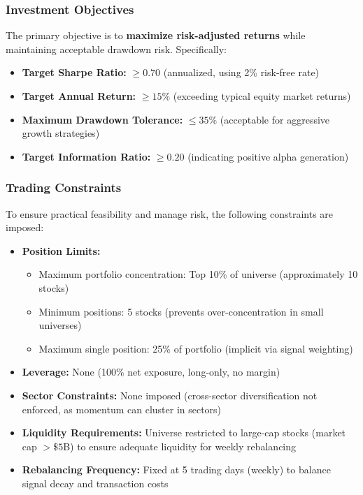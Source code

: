\documentclass[conference]{IEEEtran}
\begin{document}
\subsubsection{Investment Objectives}
The primary objective is to \textbf{maximize risk-adjusted returns} while maintaining acceptable drawdown risk. Specifically:
\begin{itemize}
    \item \textbf{Target Sharpe Ratio:} $\geq 0.70$ (annualized, using 2\% risk-free rate)
    \item \textbf{Target Annual Return:} $\geq 15\%$ (exceeding typical equity market returns)
    \item \textbf{Maximum Drawdown Tolerance:} $\leq 35\%$ (acceptable for aggressive growth strategies)
    \item \textbf{Target Information Ratio:} $\geq 0.20$ (indicating positive alpha generation)
\end{itemize}

\subsubsection{Trading Constraints}
To ensure practical feasibility and manage risk, the following constraints are imposed:
\begin{itemize}
    \item \textbf{Position Limits:}
    \begin{itemize}
        \item Maximum portfolio concentration: Top 10\% of universe (approximately 10 stocks)
        \item Minimum positions: 5 stocks (prevents over-concentration in small universes)
        \item Maximum single position: 25\% of portfolio (implicit via signal weighting)
    \end{itemize}
    \item \textbf{Leverage:} None (100\% net exposure, long-only, no margin)
    \item \textbf{Sector Constraints:} None imposed (cross-sector diversification not enforced, as momentum can cluster in sectors)
    \item \textbf{Liquidity Requirements:} Universe restricted to large-cap stocks (market cap $> \$5$B) to ensure adequate liquidity for weekly rebalancing
    \item \textbf{Rebalancing Frequency:} Fixed at 5 trading days (weekly) to balance signal decay and transaction costs
\end{itemize}
\end{document}
